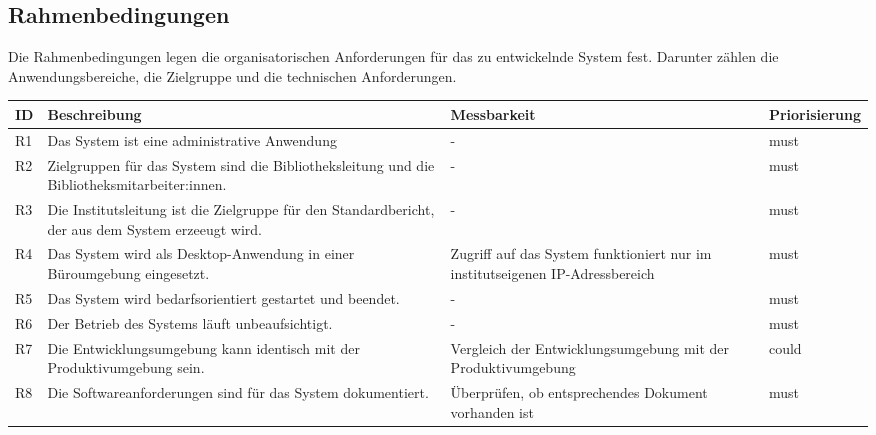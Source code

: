 \subsection{Rahmenbedingungen}
Die Rahmenbedingungen legen die organisatorischen Anforderungen für das zu entwickelnde System fest. 
Darunter zählen die Anwendungsbereiche, die Zielgruppe und die technischen Anforderungen. 
\begingroup
\setlength{\tabcolsep}{10pt} %
\renewcommand{\arraystretch}{1.25} 
\begin{table}[h]
    \centering
    \begin{adjustbox}{max width=\textwidth}
    \begin{tabular}{lp{6.5cm}p{6.5cm}l}
       \toprule
       \textbf{ID}          & \textbf{Beschreibung} & \textbf{Messbarkeit} & \textbf{Priorisierung}\\
       \midrule
        R1                                &Das System ist eine administrative Anwendung & -  & must\\
        R2                                &Zielgruppen für das System sind die Bibliotheksleitung und die Bibliotheksmitarbeiter:innen. & -  & must\\
        R3                                &Die Institutsleitung ist die Zielgruppe für den Standardbericht, der aus dem System erzeeugt wird. & -  & must\\
        R4                                &Das System wird als Desktop-Anwendung in einer Büroumgebung eingesetzt. & Zugriff auf das System funktioniert nur im institutseigenen IP-Adressbereich & must\\
        R5                                &Das System wird bedarfsorientiert gestartet und beendet. & -  & must\\
        R6                                &Der Betrieb des Systems läuft unbeaufsichtigt. & -  & must\\
        R7                                &Die Entwicklungsumgebung kann identisch mit der Produktivumgebung sein. & Vergleich der Entwicklungsumgebung mit der Produktivumgebung  & could\\
        R8                                &Die Softwareanforderungen sind für das System dokumentiert. & Überprüfen, ob entsprechendes Dokument vorhanden ist  & must\\

\end{tabular}
\end{adjustbox}
\end{table}
